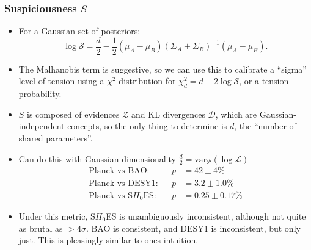 \documentclass[aspectratio=169]{beamer}
\begin{document}
\begin{frame}
    \frametitle{Suspiciousness $S$}
    \begin{itemize}
        \item For a Gaussian set of posteriors:
            \[
                \log \mathcal{S} = \frac{d}{2}  -\frac{1}{2} (\mu_A-\mu_B){(\Sigma_{A}+\Sigma_{B})}^{-1}(\mu_A-\mu_B).
            \]
        \item The Malhanobis  term is suggestive, so we can use this to calibrate a ``sigma'' level of tension using a $\chi^2$ distribution for $\chi^2_d=d-2\log \mathcal{S}$, or a tension probability.
        \item $S$ is composed of evidences $\mathcal{Z}$ and KL divergences $\mathcal{D}$, which are Gaussian-independent concepts, so the only thing to determine is $d$, the ``number of shared parameters''.
        \item Can do this with Gaussian dimensionality $\frac{d}{2}=\text{var}_\mathcal{P}(\log \mathcal{L})$~
            \begin{align}
                \text{Planck vs BAO}:&      &p&=  42 \pm     4 \% \nonumber\\
                \text{Planck vs DESY1}:&      &p&=   3.2 \pm     1.0 \% \nonumber\\
                \text{Planck vs S$H_0$ES}:& &p&=   0.25 \pm     0.17 \% \nonumber
            \end{align}
        \item Under this metric, S$H_0$ES is unambiguously inconsistent, although not quite as brutal as $>4\sigma$. BAO is consistent, and DESY1 is inconsistent, but only just. This is pleasingly similar to ones intuition.
    \end{itemize}

\end{frame}
\end{document}
